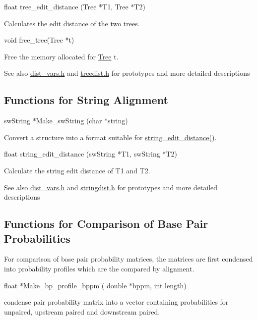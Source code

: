 \begin{DoxyVerb}float   tree_edit_distance (Tree *T1,
                            Tree *T2) 
\end{DoxyVerb}
 Calculates the edit distance of the two trees.

\begin{DoxyVerb}void    free_tree(Tree *t)
\end{DoxyVerb}
 Free the memory allocated for \mbox{\hyperlink{structTree}{Tree}} t.

\begin{DoxySeeAlso}{See also}
\mbox{\hyperlink{dist__vars_8h}{dist\+\_\+vars.\+h}} and \mbox{\hyperlink{treedist_8h}{treedist.\+h}} for prototypes and more detailed descriptions
\end{DoxySeeAlso}
\hypertarget{distance_measures_sec_string_alignment}{}\subsection{Functions for String Alignment}\label{distance_measures_sec_string_alignment}
\begin{DoxyVerb}swString *Make_swString (char *string)
\end{DoxyVerb}
 Convert a structure into a format suitable for \mbox{\hyperlink{stringdist_8h_a89e3c335ef17780576d7c0e713830db9}{string\+\_\+edit\+\_\+distance()}}.

\begin{DoxyVerb}float     string_edit_distance (swString *T1,
                                swString *T2)
\end{DoxyVerb}
 Calculate the string edit distance of T1 and T2.

\begin{DoxySeeAlso}{See also}
\mbox{\hyperlink{dist__vars_8h}{dist\+\_\+vars.\+h}} and \mbox{\hyperlink{stringdist_8h}{stringdist.\+h}} for prototypes and more detailed descriptions
\end{DoxySeeAlso}
\hypertarget{distance_measures_sec_compare_base_pair_probs}{}\subsection{Functions for Comparison of Base Pair Probabilities}\label{distance_measures_sec_compare_base_pair_probs}
For comparison of base pair probability matrices, the matrices are first condensed into probability profiles which are the compared by alignment.

\begin{DoxyVerb}float *Make_bp_profile_bppm ( double *bppm,
                              int length)
\end{DoxyVerb}
 condense pair probability matrix into a vector containing probabilities for unpaired, upstream paired and downstream paired.

